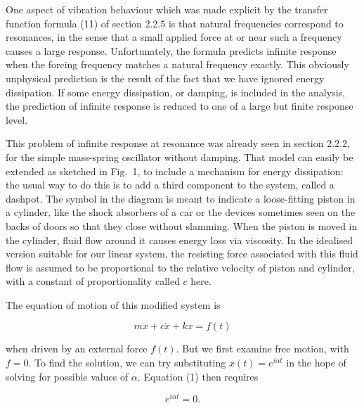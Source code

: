   One aspect of vibration behaviour which was made explicit by the transfer 
  function formula (11) of section 2.2.5 is that natural frequencies correspond 
  to resonances, in the sense that a small applied force at or near such a 
  frequency causes a large response. Unfortunately, the formula predicts 
  infinite response when the forcing frequency matches a natural frequency 
  exactly. This obviously unphysical prediction is the result of the fact that 
  we have ignored energy dissipation. If some energy dissipation, or damping, 
  is included in the analysis, the prediction of infinite response is reduced 
  to one of a large but finite response level. 

  This problem of infinite response at resonance was already seen in section 
  2.2.2, for the simple mass-spring oscillator without damping. That model can 
  easily be extended as sketched in Fig.\ 1, to include a mechanism for energy 
  dissipation: the usual way to do this is to add a third component to the 
  system, called a dashpot. The symbol in the diagram is meant to indicate a 
  loose-fitting piston in a cylinder, like the shock absorbers of a car or the 
  devices sometimes seen on the backs of doors so that they close without 
  slamming. When the piston is moved in the cylinder, fluid flow around it 
  causes energy loss via viscosity. In the idealised version suitable for our 
  linear system, the resisting force associated with this fluid flow is assumed 
  to be proportional to the relative velocity of piston and cylinder, with a 
  constant of proportionality called $c$ here. 


  The equation of motion of this modified system is 

  \begin{equation*}m \ddot{x}+c\dot{x} +kx=f(t) \tag{1} \end{equation*} 

  \noindent{}when driven by an external force $f(t)$. But we first examine free 
  motion, with $f=0$. To find the solution, we can try substituting $x(t)=e^{i 
  \alpha t}$ in the hope of solving for possible values of $\alpha$. Equation 
  (1) then requires 

  \begin{equation*}[-\alpha^2 m +i \alpha c + k] e^{i \alpha t} =0. \tag{2} 
  \end{equation*} 


